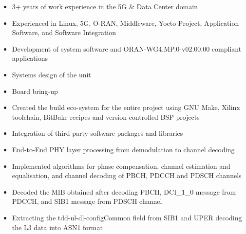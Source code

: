 \documentclass[10pt, letterpaper]{altacv}
\begin{document}

\begin{fullwidth}
\makecvheader
\end{fullwidth}

\begin{itemize}
\item 3+ years of work experience in the 5G \& Data Center domain
\item Experienced in Linux, 5G, O-RAN, Middleware, Yocto Project, Application Software, and Software Integration
\end{itemize}


\begin{itemize}
\item Development of system software and ORAN-WG4.MP.0-v02.00.00 compliant applications
\item Systems design of the unit
\item Board bring-up
\item Created the build eco-system for the entire project using GNU Make, Xilinx toolchain, BitBake recipes and version-controlled BSP projects
\item Integration of third-party software packages and libraries
\end{itemize}

\vspace{0.5cm}

\begin{itemize}
\item End-to-End PHY layer processing from demodulation to channel decoding
\item Implemented algorithms for phase compensation, channel estimation and equalisation, and channel decoding of PBCH, PDCCH and PDSCH channels
\item Decoded the MIB obtained after decoding PBCH, DCI\_1\_0 message from PDCCH, and SIB1 message from PDSCH channel
\item Extracting the tdd-ul-dl-conﬁgCommon field from SIB1 and UPER decoding the L3 data into ASN1 format
\end{itemize}
\end{document}
